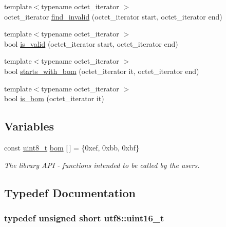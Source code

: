 \begin{DoxyCompactItemize}
\item 
{\footnotesize template$<$typename octet\+\_\+iterator $>$ }\\octet\+\_\+iterator \hyperlink{namespaceutf8_ae29721faca762865e83ffea06605acc5}{find\+\_\+invalid} (octet\+\_\+iterator start, octet\+\_\+iterator end)
\item 
{\footnotesize template$<$typename octet\+\_\+iterator $>$ }\\bool \hyperlink{namespaceutf8_add2dbec3d058aa66500ec4f97cc8174b}{is\+\_\+valid} (octet\+\_\+iterator start, octet\+\_\+iterator end)
\item 
{\footnotesize template$<$typename octet\+\_\+iterator $>$ }\\bool \hyperlink{namespaceutf8_a498c8e7d7a6fd92d4672ef05661dc783}{starts\+\_\+with\+\_\+bom} (octet\+\_\+iterator it, octet\+\_\+iterator end)
\item 
{\footnotesize template$<$typename octet\+\_\+iterator $>$ }\\bool \hyperlink{namespaceutf8_aed9555bcddc0fd46296bf4e5642229ed}{is\+\_\+bom} (octet\+\_\+iterator it)
\end{DoxyCompactItemize}
\subsection*{Variables}
\begin{DoxyCompactItemize}
\item 
const \hyperlink{namespaceutf8_abe793b552fabe390d134b97ab81d2c7f}{uint8\+\_\+t} \hyperlink{namespaceutf8_ac7efcab62f51d362fc741657e60b9b1d}{bom} \mbox{[}$\,$\mbox{]} = \{0xef, 0xbb, 0xbf\}
\begin{DoxyCompactList}\small\item\em The library A\+PI -\/ functions intended to be called by the users. \end{DoxyCompactList}\end{DoxyCompactItemize}


\subsection{Typedef Documentation}
\subsubsection[{uint16\+\_\+t}]{\setlength{\rightskip}{0pt plus 5cm}typedef unsigned short {\bf utf8\+::uint16\+\_\+t}}\hypertarget{namespaceutf8_ac23066b92c5a1d9d9ef177201f750936}{}\label{namespaceutf8_ac23066b92c5a1d9d9ef177201f750936}

